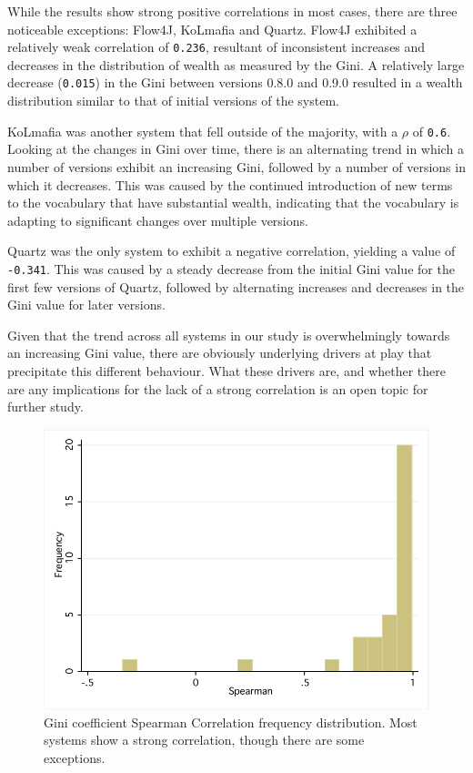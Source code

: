 While the results show strong positive correlations in most cases, there are three noticeable exceptions: Flow4J, KoLmafia and Quartz. Flow4J exhibited a relatively weak correlation of \texttt{0.236}, resultant of inconsistent increases and decreases in the distribution of wealth as measured by the Gini. A relatively large decrease (\texttt{0.015}) in the Gini between versions 0.8.0 and 0.9.0 resulted in a wealth distribution similar to that of initial versions of the system.

KoLmafia was another system that fell outside of the majority, with a $\rho$ of \texttt{0.6}. Looking at the changes in Gini over time, there is an alternating trend in which a number of versions exhibit an increasing Gini, followed by a number of versions in which it decreases. This was caused by the continued introduction of new terms to the vocabulary that have substantial wealth, indicating that the vocabulary is adapting to significant changes over multiple versions.

Quartz was the only system to exhibit a negative correlation, yielding a value of \texttt{-0.341}. This was caused by a steady decrease from the initial Gini value for the first few versions of Quartz, followed by alternating increases and decreases in the Gini value for later versions.

Given that the trend across all systems in our study is overwhelmingly towards an increasing Gini value, there are obviously underlying drivers at play that precipitate this different behaviour. What these drivers are, and whether there are any implications for the lack of a strong correlation is an open topic for further study.

\begin{figure}[t]
\centering
\includegraphics[width=\textwidth]{Figures/Vocab-GiniSpearmanFreqDist.pdf}
\caption{Gini coefficient Spearman Correlation frequency distribution. Most systems show a strong correlation, though there are some exceptions.}
\label{fig:vocab-gini-spearman}
\end{figure}

